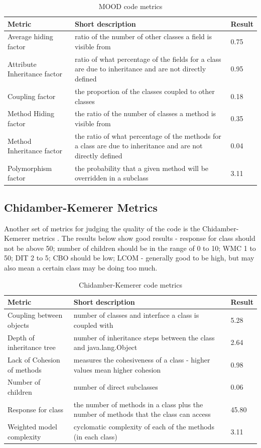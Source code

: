 \documentclass{l4proj}
\begin{document}
\begin{table}[H]
\small
\caption{MOOD code metrics}
\centering
\def\arraystretch{1.5}
\begin{tabular}{p{4cm}p{5cm}p{2.5cm}}
\hline
Metric & Short description & Result\\
\hline
Average hiding factor & ratio of the number of other classes a field is visible from & 0.75\\ 
Attribute Inheritance factor & ratio of what percentage of the fields for a class are due to inheritance and are not directly defined & 0.95\\
Coupling factor & the proportion of the classes coupled to other classes & 0.18\\
Method Hiding factor & the ratio of the number of classes a method is visible from & 0.35\\
Method Inheritance factor & the ratio of what percentage of the methods for a class are due to inheritance and are not directly defined & 0.04\\
Polymorphism factor & the probability that a given method will be overridden in a subclass & 3.11\\
\hline
\end{tabular}
\label{table:mood-codemetrics}
\end{table}

\subsection{Chidamber-Kemerer Metrics}

Another set of metrics for judging the quality of the code is the Chidamber-Kemerer metrics \cite{recommended-ck} \cite{recommended-ck2}. The results below show good results - response for class should not be above 50; number of children should be in the range of 0 to 10; WMC 1 to 50; DIT 2 to 5; CBO should be low; LCOM - generally good to be high, but may also mean a certain class may be doing too much.

\begin{table}[H]
\small
\caption{Chidamber-Kemerer code metrics}
\centering
\def\arraystretch{1.5}
\begin{tabular}{p{4cm}p{5cm}p{2.5cm}}
\hline
Metric & Short description & Result\\
\hline
Coupling between objects & number of classes and interface a class is coupled with & 5.28\\ 
Depth of inheritance tree & number of inheritance steps between the class and java.lang.Object & 2.64\\
Lack of Cohesion of methods & measures the cohesiveness of a class - higher values mean higher cohesion & 0.98\\
Number of children & number of direct subclasses & 0.06\\
Response for class & the number of methods in a class plus the number of methods that the class can access & 45.80\\
Weighted model complexity & cyclomatic complexity of each of the methods (in each class) & 3.11\\
\hline
\end{tabular}
\label{table:ck-codemetrics}
\end{table}
\end{document}
